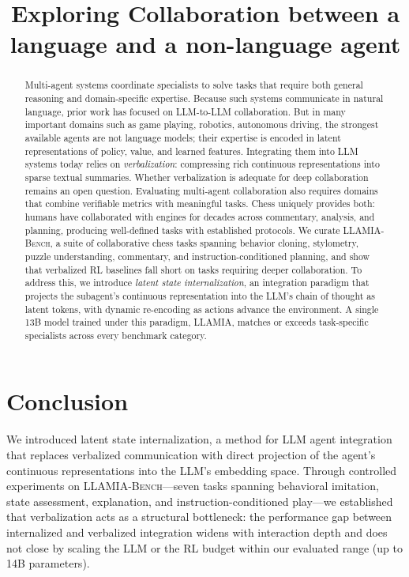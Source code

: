 \documentclass{article}
\title{Exploring Collaboration between a language and a non-language agent}
\theoremstyle{plain}
\theoremstyle{definition}
\theoremstyle{remark}
\theoremstyle{plain}
\theoremstyle{definition}
\theoremstyle{remark}
\begin{document}
\maketitle

 \begin{abstract}                                                                                          
  Multi-agent systems coordinate specialists to solve tasks that require both general reasoning and
  domain-specific expertise. Because such systems communicate in natural language, prior work has focused on
   LLM-to-LLM collaboration. But in many important domains such as game playing, robotics, autonomous
  driving, the strongest available agents are not language models; their expertise is encoded in latent    
  representations of policy, value, and learned features. Integrating them into LLM systems today relies on
  \emph{verbalization}: compressing rich continuous representations into sparse textual summaries. Whether
  verbalization is adequate for deep collaboration remains an open question. Evaluating multi-agent collaboration also requires domains that combine verifiable metrics with meaningful
   tasks. Chess uniquely provides both: humans have collaborated with engines for decades across commentary,
   analysis, and planning, producing well-defined tasks with established protocols. We curate               
  \textsc{LLAMIA-Bench}, a suite of collaborative chess tasks spanning behavior cloning, stylometry, puzzle
  understanding, commentary, and instruction-conditioned planning, and show that verbalized RL baselines
  fall short on tasks requiring deeper collaboration. To address this, we introduce \emph{latent state
  internalization}, an integration paradigm that projects the subagent's continuous representation into the
  LLM's chain of thought as latent tokens, with dynamic re-encoding as actions advance the environment. A
  single 13B model trained under this paradigm, \textsc{LLAMIA}, matches or exceeds task-specific
  specialists across every benchmark category.
  \end{abstract}





\section{Conclusion}
\label{sec:conclusion}

We introduced latent state internalization, a method for LLM agent integration that replaces verbalized communication with direct projection of the agent's continuous representations into the LLM's embedding space. Through controlled experiments on \textsc{LLAMIA-Bench}---seven tasks spanning behavioral imitation, state assessment, explanation, and instruction-conditioned play---we established that verbalization acts as a structural bottleneck: the performance gap between internalized and verbalized integration widens with interaction depth and does not close by scaling the LLM or the RL budget within our evaluated range (up to 14B parameters).
\end{document}
